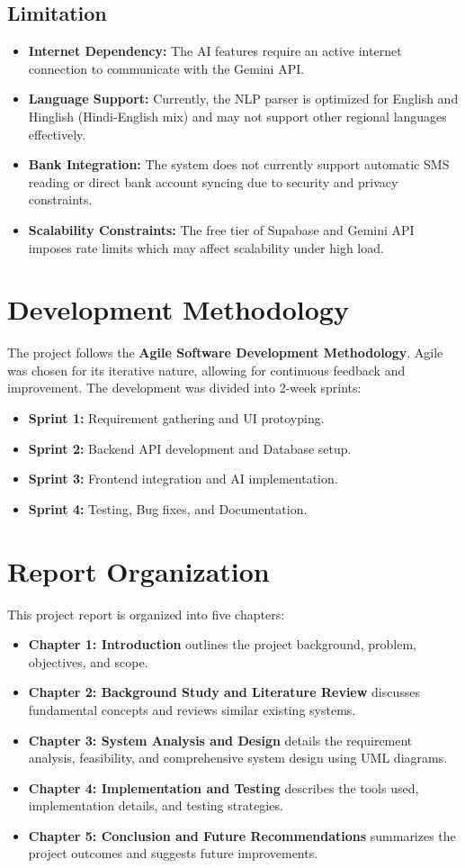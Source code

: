 \subsection{Limitation}
\begin{itemize}
    \item \textbf{Internet Dependency:} The AI features require an active internet connection to communicate with the Gemini API.
    \item \textbf{Language Support:} Currently, the NLP parser is optimized for English and Hinglish (Hindi-English mix) and may not support other regional languages effectively.
    \item \textbf{Bank Integration:} The system does not currently support automatic SMS reading or direct bank account syncing due to security and privacy constraints.
    \item \textbf{Scalability Constraints:} The free tier of Supabase and Gemini API imposes rate limits which may affect scalability under high load.
\end{itemize}

\section{Development Methodology}
The project follows the \textbf{Agile Software Development Methodology}. Agile was chosen for its iterative nature, allowing for continuous feedback and improvement. 
The development was divided into 2-week sprints:
\begin{itemize}
    \item \textbf{Sprint 1:} Requirement gathering and UI protoyping.
    \item \textbf{Sprint 2:} Backend API development and Database setup.
    \item \textbf{Sprint 3:} Frontend integration and AI implementation.
    \item \textbf{Sprint 4:} Testing, Bug fixes, and Documentation.
\end{itemize}

\section{Report Organization}
This project report is organized into five chapters:
\begin{itemize}
    \item \textbf{Chapter 1: Introduction} outlines the project background, problem, objectives, and scope.
    \item \textbf{Chapter 2: Background Study and Literature Review} discusses fundamental concepts and reviews similar existing systems.
    \item \textbf{Chapter 3: System Analysis and Design} details the requirement analysis, feasibility, and comprehensive system design using UML diagrams.
    \item \textbf{Chapter 4: Implementation and Testing} describes the tools used, implementation details, and testing strategies.
    \item \textbf{Chapter 5: Conclusion and Future Recommendations} summarizes the project outcomes and suggests future improvements.
\end{itemize}
